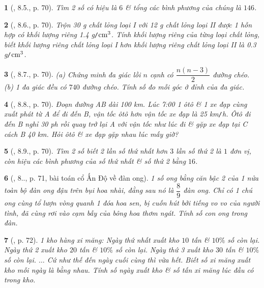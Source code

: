 \documentclass{article}
\newtheorem{baitoan}{}
\begin{document}
\begin{baitoan}[\cite{Binh_boi_duong_Toan_9_tap_2}, 8.5., p. 70]
	Tìm 2 số có hiệu là $6$ \& tổng các bình phương của chúng là $146$.
\end{baitoan}

\begin{baitoan}[\cite{Binh_boi_duong_Toan_9_tap_2}, 8.6., p. 70]
	Trộn {\rm30 g} chất lỏng loại I với {\rm12 g} chất lỏng loại II được 1 hỗn hợp có khối lượng riêng {\rm1.4 g{\tt/}$\rm cm^3$}. Tính khối lượng riêng của từng loại chất lỏng, biết khối lượng riêng chất lỏng loại I hơn khối lượng riêng chất lỏng loại II là {\rm0.3 g{\tt/}$\rm cm^3$}.
\end{baitoan}

\begin{baitoan}[\cite{Binh_boi_duong_Toan_9_tap_2}, 8.7., p. 70]
	(a) Chứng minh đa giác lồi $n$ cạnh có $\dfrac{n(n - 3)}{2}$ đường chéo. (b) 1 đa giác đều có $740$ đường chéo. Tính số đo mỗi góc ở đỉnh của đa giác.
\end{baitoan}

\begin{baitoan}[\cite{Binh_boi_duong_Toan_9_tap_2}, 8.8., p. 70]
	Đoạn đường AB dài {\rm100 km}. Lúc {\rm7:00} 1 ôtô \& 1 xe đạp cùng xuất phát từ A để đi đến B, vận tốc ôtô hơn vận tốc xe đạp là {\rm25 km{\tt/}h}. Ôtô đi đến B nghỉ {\rm30 ph} rồi quay trở lại A với vận tốc như lúc đi \& gặp xe đạp tại C cách B {\rm40 km}. Hỏi ôtô \& xe đạp gặp nhau lúc mấy giờ?
\end{baitoan}

\begin{baitoan}[\cite{Binh_boi_duong_Toan_9_tap_2}, 8.9., p. 70]
	Tìm 2 số biết 2 lần số thứ nhất hơn $3$ lần số thứ 2 là $1$ đơn vị, còn hiệu các bình phương của số thứ nhất \& số thứ 2 bằng $16$.
\end{baitoan}

\begin{baitoan}[\cite{Binh_boi_duong_Toan_9_tap_2}, 8.., p. 71, bài toán cổ Ấn Độ về đàn ong]
	1 số ong bằng căn bậc 2 của 1 nửa toàn bộ đàn ong đậu trên bụi hoa nhài, đằng sau nó là $\dfrac{8}{9}$ đàn ong. Chỉ có 1 chú ong cùng tổ lượn vòng quanh 1 đóa hoa sen, bị cuốn hút bởi tiếng vo vo của người tình, đã cùng rơi vào cạm bẫy của bông hoa thơm ngát. Tính số con ong trong đàn.
\end{baitoan}

\begin{baitoan}[\cite{Binh_boi_duong_Toan_9_tap_2}, p. 72]
	1 kho hàng xi măng: Ngày thứ nhất xuất kho $10$ tấn \& $10\%$ số còn lại. Ngày thứ 2 xuất kho $20$ tấn \& $10\%$ số còn lại. Ngày thứ 3 xuất kho $30$ tấn \& $10\%$ số còn lại. $\ldots$ Cứ như thế đến ngày cuối cùng thì vừa hết. Biết số xi măng xuất kho mỗi ngày là bằng nhau. Tính số ngày xuất kho \& số tấn xi măng lúc đầu có trong kho.
\end{baitoan}
\end{document}

